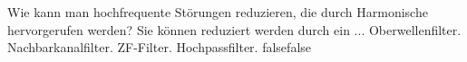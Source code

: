     {Wie kann man hochfrequente Störungen reduzieren, die durch Harmonische hervorgerufen werden? Sie können reduziert werden durch ein ...}
    {Oberwellenfilter.}
    {Nachbarkanalfilter.}
    {ZF-Filter.}
    {Hochpassfilter.}
    {false}{false}